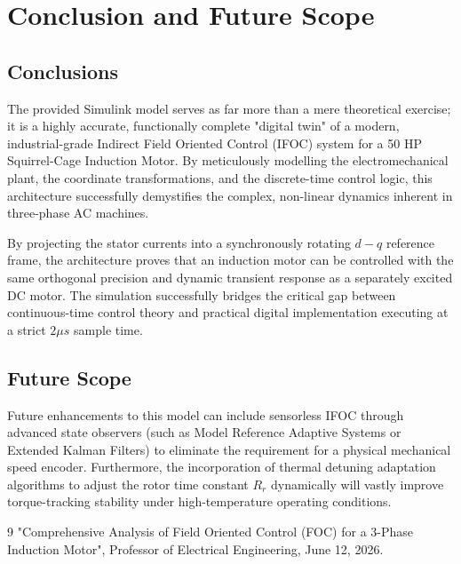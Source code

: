 \documentclass[12pt,a4paper]{report}
\begin{document}
\chapter{Conclusion and Future Scope}
\section{Conclusions}
The provided Simulink model serves as far more than a mere theoretical exercise; it is a highly accurate, functionally complete "digital twin" of a modern, industrial-grade Indirect Field Oriented Control (IFOC) system for a 50 HP Squirrel-Cage Induction Motor. By meticulously modelling the electromechanical plant, the coordinate transformations, and the discrete-time control logic, this architecture successfully demystifies the complex, non-linear dynamics inherent in three-phase AC machines.

By projecting the stator currents into a synchronously rotating $d-q$ reference frame, the architecture proves that an induction motor can be controlled with the same orthogonal precision and dynamic transient response as a separately excited DC motor. The simulation successfully bridges the critical gap between continuous-time control theory and practical digital implementation executing at a strict $2\mu s$ sample time.

\section{Future Scope}
Future enhancements to this model can include sensorless IFOC through advanced state observers (such as Model Reference Adaptive Systems or Extended Kalman Filters) to eliminate the requirement for a physical mechanical speed encoder. Furthermore, the incorporation of thermal detuning adaptation algorithms to adjust the rotor time constant $R_r$ dynamically will vastly improve torque-tracking stability under high-temperature operating conditions.

\begin{thebibliography}{9}
"Comprehensive Analysis of Field Oriented Control (FOC) for a 3-Phase Induction Motor", Professor of Electrical Engineering, June 12, 2026.
\end{thebibliography}
\end{document}
